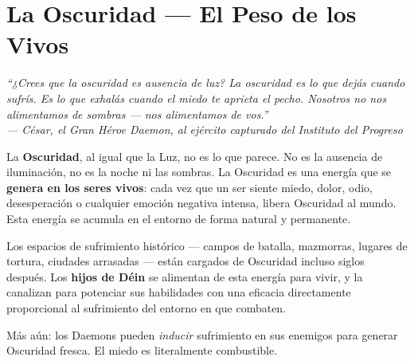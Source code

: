 \section{La Oscuridad — El Peso de los Vivos}

\begin{tcolorbox}[enhanced, colback=DeepBlack!95, colframe=HammerRed!70,
    title={\color{HammerRed!80}\textbf{LA OSCURIDAD}},
    fonttitle=\large\bfseries,
    attach boxed title to top left={xshift=4mm, yshift=-2mm},
    boxed title style={colback=DeepBlack, colframe=HammerRed}]
    \color{white}
    \itshape
    ``¿Crees que la oscuridad es ausencia de luz? La oscuridad es lo que dejás cuando sufrís. Es lo que exhalás cuando el miedo te aprieta el pecho. Nosotros no nos alimentamos de sombras — nos alimentamos de vos.''\\[4pt]
    \hfill — \textit{César, el Gran Héroe Daemon, al ejército capturado del Instituto del Progreso}
\end{tcolorbox}

\vspace{0.3cm}

La \textbf{Oscuridad}, al igual que la Luz, no es lo que parece. No es la ausencia de iluminación, no es la noche ni las sombras. La Oscuridad es una energía que se \textbf{genera en los seres vivos}: cada vez que un ser siente miedo, dolor, odio, desesperación o cualquier emoción negativa intensa, libera Oscuridad al mundo. Esta energía se acumula en el entorno de forma natural y permanente.

Los espacios de sufrimiento histórico — campos de batalla, mazmorras, lugares de tortura, ciudades arrasadas — están cargados de Oscuridad incluso siglos después. Los \textbf{hijos de Déin} se alimentan de esta energía para vivir, y la canalizan para potenciar sus habilidades con una eficacia directamente proporcional al sufrimiento del entorno en que combaten.

Más aún: los Daemons pueden \textit{inducir} sufrimiento en sus enemigos para generar Oscuridad fresca. El miedo es literalmente combustible.

